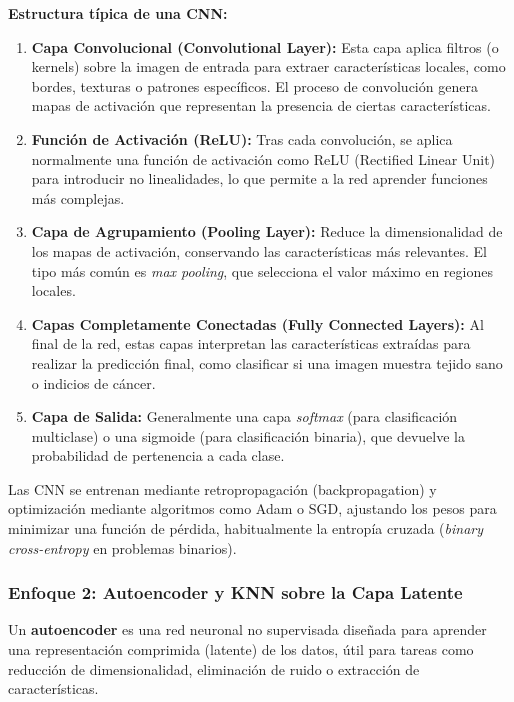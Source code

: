 \documentclass[12pt]{article} %
\begin{document}
\textbf{Estructura típica de una CNN:}
\begin{enumerate}
    \item \textbf{Capa Convolucional (Convolutional Layer):} Esta capa aplica filtros (o kernels) sobre la imagen de entrada para extraer características locales, como bordes, texturas o patrones específicos. El proceso de convolución genera mapas de activación que representan la presencia de ciertas características.
    \item \textbf{Función de Activación (ReLU):} Tras cada convolución, se aplica normalmente una función de activación como ReLU (Rectified Linear Unit) para introducir no linealidades, lo que permite a la red aprender funciones más complejas.
    \item \textbf{Capa de Agrupamiento (Pooling Layer):} Reduce la dimensionalidad de los mapas de activación, conservando las características más relevantes. El tipo más común es \textit{max pooling}, que selecciona el valor máximo en regiones locales.
    \item \textbf{Capas Completamente Conectadas (Fully Connected Layers):} Al final de la red, estas capas interpretan las características extraídas para realizar la predicción final, como clasificar si una imagen muestra tejido sano o indicios de cáncer.
    \item \textbf{Capa de Salida:} Generalmente una capa \textit{softmax} (para clasificación multiclase) o una sigmoide (para clasificación binaria), que devuelve la probabilidad de pertenencia a cada clase.

\end{enumerate}

Las CNN se entrenan mediante retropropagación (backpropagation) y optimización mediante algoritmos como Adam o SGD, ajustando los pesos para minimizar una función de pérdida, habitualmente la entropía cruzada (\textit{binary cross-entropy} en problemas binarios).

\subsubsection{Enfoque 2: Autoencoder y KNN sobre la Capa Latente}
Un \textbf{autoencoder} es una red neuronal no supervisada diseñada para aprender una representación comprimida (latente) de los datos, útil para tareas como reducción de dimensionalidad, eliminación de ruido o extracción de características.
\end{document}
